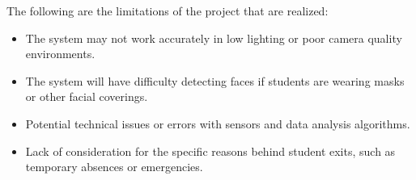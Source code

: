 The following are the limitations of the project that are realized:
\begin{itemize}
 	
        \item The system may not work accurately in low lighting or poor camera quality environments.
        \item The system will have difficulty detecting faces if students are wearing masks or other facial coverings.
        \item Potential technical issues or errors with sensors and data analysis algorithms.
	\item Lack of consideration for the specific reasons behind student exits, such as temporary absences or emergencies.


 \end{itemize}